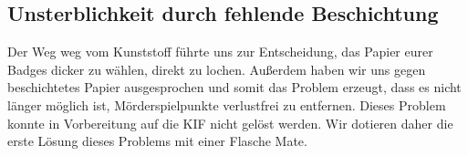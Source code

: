 \subsection*{Unsterblichkeit durch fehlende Beschichtung}
Der Weg weg vom Kunststoff führte uns zur Entscheidung, das Papier eurer Badges dicker zu wählen, direkt zu lochen.
Außerdem haben wir uns gegen beschichtetes Papier ausgesprochen und somit das Problem erzeugt, dass es nicht länger möglich ist, Mörderspielpunkte verlustfrei zu entfernen.
Dieses Problem konnte in Vorbereitung auf die KIF nicht gelöst werden.
Wir dotieren daher die erste Lösung dieses Problems mit einer Flasche Mate.
